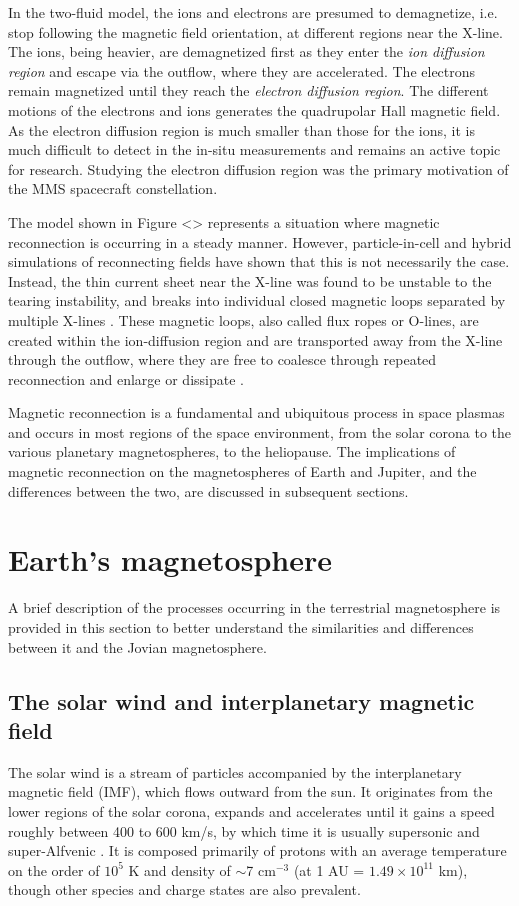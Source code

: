 In the two-fluid model, the ions and electrons are presumed to demagnetize, i.e. stop following the magnetic field orientation, at different regions near the X-line. The ions, being heavier, are demagnetized first as they enter the \emph{ion diffusion region} and escape via the outflow, where they are accelerated. The electrons remain magnetized until they reach the \emph{electron diffusion region}. The different motions of the electrons and ions generates the quadrupolar Hall magnetic field. As the electron diffusion region is much smaller than those for the ions, it is much difficult to detect in the in-situ measurements and remains an active topic for research. Studying the electron diffusion region was the primary motivation of the MMS spacecraft constellation. 

The model shown in Figure <> represents a situation where magnetic reconnection is occurring in a steady manner. However, particle-in-cell and hybrid simulations of reconnecting fields have shown that this is not necessarily the case. Instead, the thin current sheet near the X-line was found to be unstable to the tearing instability, and breaks into individual closed magnetic loops separated by multiple X-lines \cite{Drake2006ElectronReconnection,Drake2006FormationReconnection}. These magnetic loops, also called flux ropes or O-lines, are created within the ion-diffusion region and are transported away from the X-line through the outflow, where they are free to coalesce through repeated reconnection and enlarge or dissipate \cite{Markidis2012CollisionlessChain,Wang2016CoalescenceReconnection}. 

Magnetic reconnection is a fundamental and ubiquitous process in space plasmas and occurs in most regions of the space environment, from the solar corona to the various planetary magnetospheres, to the heliopause. The implications of magnetic reconnection on the magnetospheres of Earth and Jupiter, and the differences between the two, are discussed in subsequent sections.


\section{Earth's magnetosphere}
A brief description of the processes occurring in the terrestrial magnetosphere is provided in this section to better understand the similarities and differences between it and the Jovian magnetosphere.

\subsection{The solar wind and interplanetary magnetic field}
The solar wind is a stream of particles accompanied by the interplanetary magnetic field (IMF), which flows outward from the sun. It originates from the lower regions of the solar corona, expands and accelerates until it gains a speed roughly between 400 to 600 km/s, by which time it is usually supersonic and super-Alfvenic \cite{Gombosi1998PhysicsEnvironment}. It is composed primarily of protons with an average temperature on the order of $10^5$ K and density of $\sim$7 cm$^{-3}$ (at 1 AU = $1.49 \times 10^{11}$ km), though other species and charge states are also prevalent.

